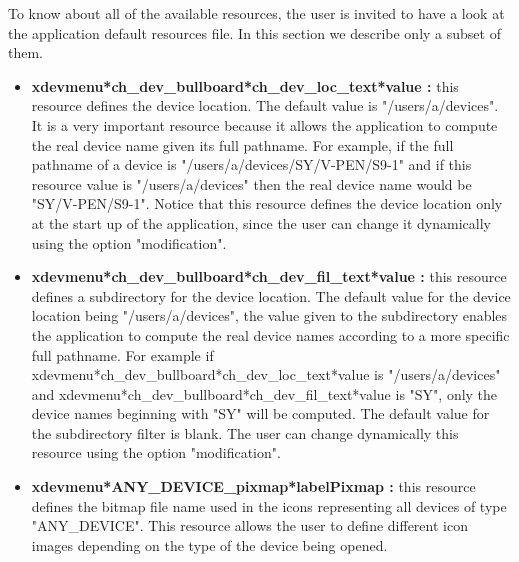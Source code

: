 To know about all of the available resources, the user is invited to have a look
at the application default resources file. In this section we describe only
a subset of them.
\begin{itemize}
\item
{\bf xdevmenu*ch\_dev\_bullboard*ch\_dev\_loc\_text*value : }this resource
defines the device location. The default value is "/users/a/devices". It is
a very important resource because it allows the application to compute the real 
device name given its full pathname. For example, if the full pathname of
a device is "/users/a/devices/SY/V-PEN/S9-1" and if this resource value is
"/users/a/devices" then the real device name would be "SY/V-PEN/S9-1".
Notice that this resource defines the device location only at the start up of
the application, since the user can change it dynamically using the option
"modification".
\item
{\bf xdevmenu*ch\_dev\_bullboard*ch\_dev\_fil\_text*value : } this resource
defines a subdirectory for the device location. The default value for the 
device location being "/users/a/devices", the value given to the subdirectory
enables the application to compute the real device names according to a more
specific full pathname. For example if
xdevmenu*ch\_dev\_bullboard*ch\_dev\_loc\_text*value is "/users/a/devices" 
and xdevmenu*ch\_dev\_bullboard*ch\_dev\_fil\_text*value
 is "SY", only the device names beginning with "SY" will be computed. The default
value for the subdirectory filter is blank. The user can change dynamically
this resource using the option "modification".
\item 
{\bf xdevmenu*ANY\_DEVICE\_pixmap*labelPixmap : } this resource defines the
bitmap file name used in the icons representing all devices of type
"ANY\_DEVICE". This resource allows the user to define different icon images
depending on the type of the device being opened.
\end{itemize}


